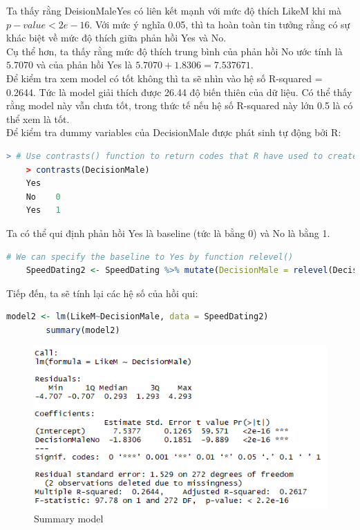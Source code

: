 \documentclass[a4paper,12pt]{article}
\begin{document}
	Ta thấy rằng DeisionMaleYes có liên kết mạnh với mức độ thích LikeM khi mà $p-value < 2e-16$. Với mức ý nghĩa 0.05, thì ta hoàn toàn tin tưởng rằng có sự khác biệt về mức độ thích giữa phản hồi Yes và No.\\
	
	Cụ thể hơn, ta thấy rằng mức độ thích trung bình của phản hồi No ước tính là $5.7070$ và của phản hồi Yes là $5.7070 + 1.8306 = 7.537671$.\\
	
	Để kiểm tra xem model có tốt không thì ta sẽ nhìn vào hệ số R-squared = 0.2644. Tức là model giải thích được 26.44 độ biến thiên của dữ liệu. Có thể thấy rằng model này vẫn chưa tốt, trong thức tế nếu hệ số R-squared này lớn 0.5 là có thể xem là tốt.\\
	
	Để kiểm tra dummy variables của DecisionMale được phát sinh tự động bởi R:
	\begin{lstlisting}[language=R]
	> # Use contrasts() function to return codes that R have used to create dummy var
	> contrasts(DecisionMale)
	Yes
	No    0
	Yes   1
	\end{lstlisting}
	
	Ta có thể qui định phản hồi Yes là baseline (tức là bằng 0) và No là bằng 1.
	\begin{lstlisting}[language=R]
	# We can specify the baseline to Yes by function relevel()
	SpeedDating2 <- SpeedDating %>% mutate(DecisionMale = relevel(DecisionMale, ref = "Yes"))
	\end{lstlisting}
	
	Tiếp đến, ta sẽ tính lại các hệ số của hồi qui:
	\begin{lstlisting}[language=R]
		model2 <- lm(LikeM~DecisionMale, data = SpeedDating2)
		summary(model2)
	\end{lstlisting}
	
	\begin{figure}[H]
		\centering
		\includegraphics[width=0.7\linewidth]{model}
		\caption{Summary model}
		\label{fig:model}
	\end{figure}
	
\end{document}
